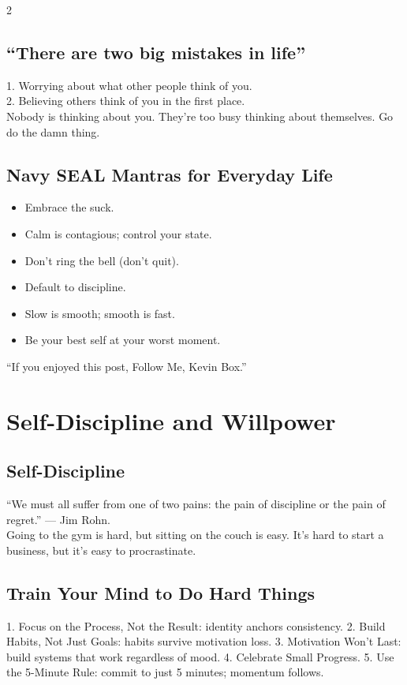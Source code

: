 \documentclass[10pt,a4paper]{article}
\begin{document}
\begin{multicols}{2}
\subsection{``There are two big mistakes in life''}
1. Worrying about what other people think of you.\\
2. Believing others think of you in the first place.\\
Nobody is thinking about you. They're too busy thinking about themselves. Go do the damn thing.

\subsection{Navy SEAL Mantras for Everyday Life}
\begin{itemize}
\item Embrace the suck.
\item Calm is contagious; control your state.
\item Don't ring the bell (don't quit).
\item Default to discipline.
\item Slow is smooth; smooth is fast.
\item Be your best self at your worst moment.
\end{itemize}
``If you enjoyed this post, Follow Me, Kevin Box.''

\section{Self-Discipline and Willpower}

\subsection{Self-Discipline}
``We must all suffer from one of two pains: the pain of discipline or the pain of regret.'' --- Jim Rohn.\\
Going to the gym is hard, but sitting on the couch is easy. It's hard to start a business, but it's easy to procrastinate.

\subsection{Train Your Mind to Do Hard Things}
1. Focus on the Process, Not the Result: identity anchors consistency. 2. Build Habits, Not Just Goals: habits survive motivation loss. 3. Motivation Won't Last: build systems that work regardless of mood. 4. Celebrate Small Progress. 5. Use the 5-Minute Rule: commit to just 5 minutes; momentum follows.


\end{multicols}
\end{document}
